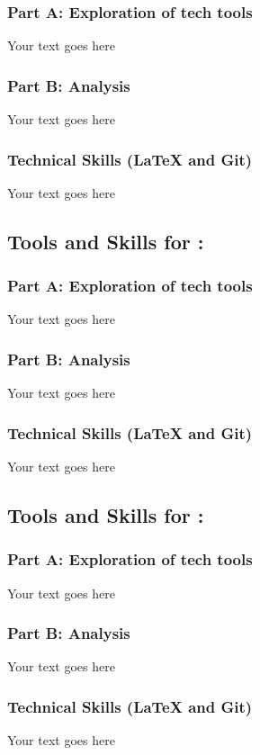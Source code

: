 \documentclass[a4paper, 11pt]{report}
\begin{document}
{\subsubsection{Part A: Exploration of tech tools}
Your text goes here
\subsubsection{Part B: Analysis}
Your text goes here
\subsubsection{Technical Skills (LaTeX and Git)}
Your text goes here
\subsection{Tools and Skills for \majB: \studB}
\subsubsection{Part A: Exploration of tech tools}
Your text goes here
\subsubsection{Part B: Analysis}
Your text goes here
\subsubsection{Technical Skills (LaTeX and Git)}
Your text goes here
\subsection{Tools and Skills for \majC: \studC}
\subsubsection{Part A: Exploration of tech tools}
Your text goes here
\subsubsection{Part B: Analysis}
Your text goes here
\subsubsection{Technical Skills (LaTeX and Git)}
Your text goes here
}
\end{document}
